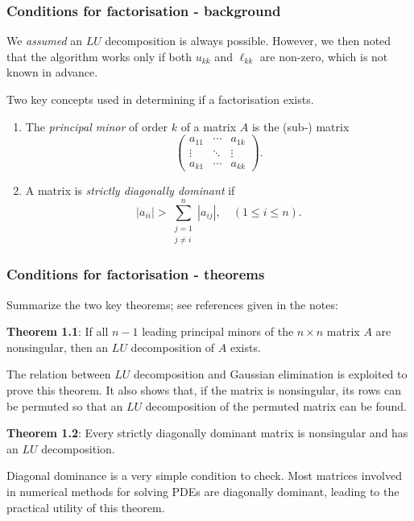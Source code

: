 \documentclass{beamer}
\begin{document}
\begin{frame}
  \frametitle{Conditions for factorisation - background}
  
  We \emph{assumed} an $LU$ decomposition is always possible. However,
  we then noted that the algorithm works only if both $u_{k k}$ and
  $\ell_{k k}$ are non-zero, which is not known in advance. \pause

  \vspace{1ex}

  Two key concepts used in determining if a factorisation exists.
  \begin{enumerate}
  \item The \emph{principal minor} of order $k$ of a matrix $A$ is the
    (sub-) matrix
    \begin{equation*}
      \begin{pmatrix}
        a_{1 1} & \cdots & a_{1 k} \\
        \vdots & \ddots & \vdots \\
        a_{k 1} & \cdots & a_{k k}
      \end{pmatrix} .
    \end{equation*} \pause
  \item A matrix is \emph{strictly diagonally dominant} if
    \begin{equation*}
      | a_{i i} | > \sum_{\substack{j = 1 \\ j \ne i}}^n | a_{i j} |,
        \quad (1 \le i \le n).
    \end{equation*}
  \end{enumerate}

\end{frame}

\begin{frame}
  \frametitle{Conditions for factorisation - theorems}
  
  Summarize the two key theorems; see references given in the notes:

  \vspace{2ex}

  {\bf Theorem 1.1}: If all $n - 1$ leading principal minors of the $n
  \times n$ matrix $A$ are nonsingular, then an $LU$ decomposition of
  $A$ exists. \pause

  \vspace{1ex}

  The relation between $LU$ decomposition and Gaussian elimination is
  exploited to prove this theorem. It also shows that, if the matrix
  is nonsingular, its rows can be permuted so that an $LU$
  decomposition of the permuted matrix can be found.  \pause

  \vspace{2ex}

  {\bf Theorem 1.2}: Every strictly diagonally dominant matrix is
  nonsingular and has an $LU$ decomposition. \pause

  \vspace{1ex}

  Diagonal dominance is a very simple condition to check. Most
  matrices involved in numerical methods for solving PDEs are
  diagonally dominant, leading to the practical utility of this
  theorem.

\end{frame}
\end{document}
